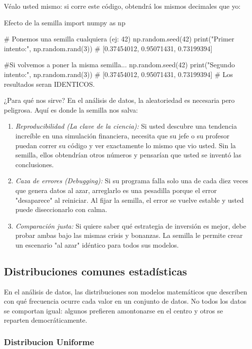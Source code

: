 Véalo usted mismo: si corre este código, obtendrá los mismos decimales que yo:
\begin{pycode}{Efecto de la semilla}
import numpy as np

# Ponemos una semilla cualquiera (ej: 42)
np.random.seed(42)
print("Primer intento:", np.random.rand(3)) # [0.37454012, 0.95071431, 0.73199394]

#Si volvemos a poner la misma semilla...
np.random.seed(42)
print("Segundo intento:", np.random.rand(3)) # [0.37454012, 0.95071431, 0.73199394]
# Los resultados seran IDENTICOS.
\end{pycode}

¿Para qué nos sirve? En el análisis de datos, la aleatoriedad es necesaria pero peligrosa. Aquí es donde la semilla nos salva:
\begin{enumerate}
\item \textit{Reproducibilidad (La clave de la ciencia):} Si usted descubre una tendencia increíble en una simulación financiera, necesita que su jefe o su profesor puedan correr su código y ver exactamente lo mismo que vio usted. Sin la semilla, ellos obtendrían otros números y pensarían que usted se inventó las conclusiones.
\item \textit{Caza de errores (\textit{Debugging}):} Si su programa falla solo una de cada diez veces que genera datos al azar, arreglarlo es una pesadilla porque el error "desaparece" al reiniciar. Al fijar la semilla, el error se vuelve estable y usted puede diseccionarlo con calma.
\item \textit{Comparación justa:} Si quiere saber qué estrategia de inversión es mejor, debe probar ambas bajo las mismas crisis y bonanzas. La semilla le permite crear un escenario "al azar" idéntico para todos sus modelos.
\end{enumerate}



\subsection{Distribuciones comunes estadísticas}

En el análisis de datos, las distribuciones son modelos matemáticos que describen con qué frecuencia ocurre cada valor en un conjunto de datos. No todos los datos se comportan igual: algunos prefieren amontonarse en el centro y otros se reparten democráticamente.

\subsubsection{Distribucion Uniforme}

